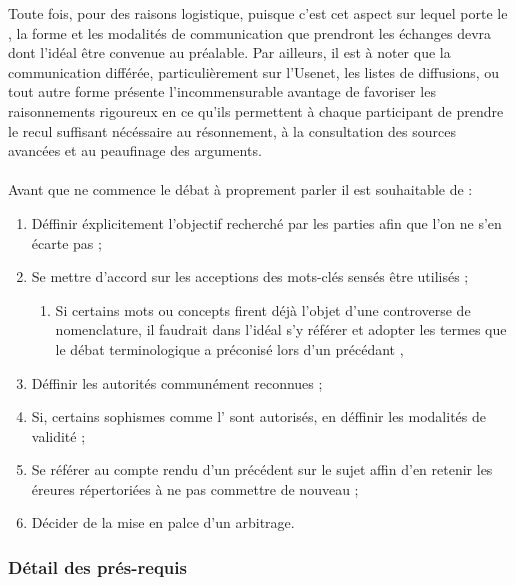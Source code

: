 Toute fois, pour des raisons logistique, puisque c’est cet aspect sur lequel porte le \mainabbr{}, la forme et les modalités de communication que prendront les échanges devra dont l’idéal être convenue au préalable. Par ailleurs, il est à noter que la communication différée, particulièrement sur l’Usenet, les listes de diffusions, ou tout autre forme présente l’incommensurable avantage de favoriser les raisonnements rigoureux en ce qu’ils permettent à chaque participant de prendre le recul suffisant nécéssaire au résonnement, à la consultation des sources avancées et au peaufinage des arguments.

\paragraph{}
Avant que ne commence le débat à proprement parler il est souhaitable de :

\begin{enumerate}
  \item Déffinir éxplicitement l’objectif recherché par les parties afin que l’on ne s’en écarte pas ;

  \item Se mettre d’accord sur les acceptions des mots-clés sensés être utilisés ;

  \begin{enumerate}
    \item Si certains mots ou concepts firent déjà l’objet d’une controverse de nomenclature, il faudrait dans l’idéal s’y référer et adopter les termes que le débat terminologique a préconisé lors d’un précédant \mainabbr{},
  \end{enumerate}

  \item Déffinir les autorités communément reconnues ;

  \item Si, certains sophismes comme l’ sont autorisés, en déffinir les modalités de validité ;

  \item Se référer au compte rendu d’un précédent \mainabbr{} sur le sujet affin d’en retenir les éreures répertoriées à ne pas commettre de nouveau ;

  \item Décider de la mise en palce d’un arbitrage.

\end{enumerate}

\subsubsection{Détail des prés-requis}
